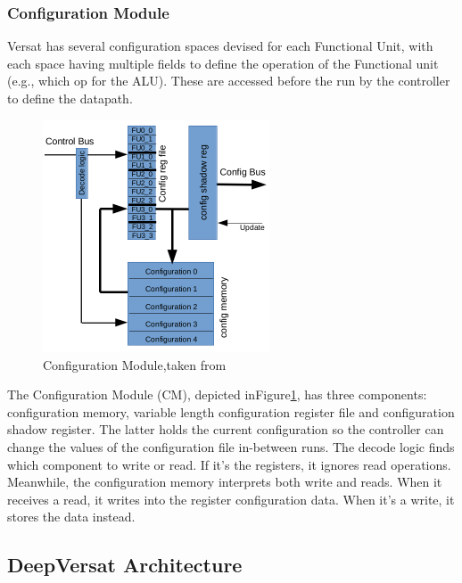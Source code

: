 \subsubsection{Configuration Module}
\quad Versat has several configuration spaces devised for each Functional Unit,
with each space having multiple fields to define the operation of the Functional unit (e.g., which op for the ALU).
These are accessed before the run by the controller to define the datapath.

\begin{figure}[!htbp]
    \centering
    \includegraphics[width=0.6\textwidth]{Figures/conf.png}
    \caption{Configuration Module,taken from~\cite{sousa:controller}}
    \label{figure:conf}
\end{figure} 

The Configuration Module (CM), depicted inFigure\ref{figure:conf}, 
has three components: configuration memory, variable length configuration register file 
and configuration shadow register.
The latter holds the current configuration so the controller can change the values of the configuration file in-between runs.
The decode logic finds which component to write or read. If it's the registers, it ignores read operations.
Meanwhile, the configuration memory interprets both write and reads. When it receives a read,
it writes into the register configuration data. When it's a write, it stores the data instead.


\newpage
\subsection{DeepVersat Architecture}


